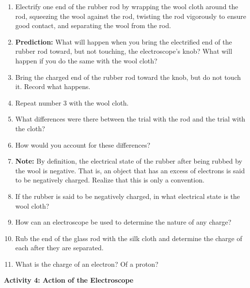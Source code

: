 \begin{enumerate}
\item Electrify one end of the rubber rod by wrapping the wool cloth around
the rod, squeezing the wool against the rod, twisting the rod vigorously
to ensure good contact, and separating the wool from the rod.
\item \textbf{Prediction:} What will happen when you bring the electrified
end of the rubber rod toward, but not touching, the electroscope's
knob? What will happen if you do the same with the wool cloth?\vspace{15mm}

\item Bring the charged end of the rubber rod toward the knob, but do not
touch it. Record what happens.\vspace{15mm}

\item Repeat number 3 with the wool cloth.\vspace{15mm}

\item What differences were there between the trial with the rod and the
trial with the cloth?\vspace{15mm}

\item How would you account for these differences?\vspace{15mm}

\item \textbf{Note:} By definition, the electrical state of the rubber after
being rubbed by the wool is negative. That is, an object that has
an excess of electrons is said to be negatively charged. Realize that
this is only a convention.
\item If the rubber is said to be negatively charged, in what electrical
state is the wool cloth?\vspace{15mm}

\item How can an electroscope be used to determine the nature of any charge?\vspace{15mm}

\item Rub the end of the glass rod with the silk cloth and determine the
charge of each after they are separated.
\item What is the charge of an electron? Of a proton?\vspace{15mm}

\end{enumerate}
\textbf{Activity 4: Action of the Electroscope}

